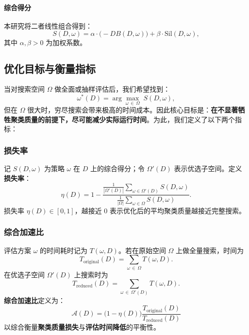 \documentclass[8pt,twocolumn]{article} %
\numberwithin{equation}{section}
\begin{document}
\paragraph{综合得分}
本研究将二者线性组合得到：
\begin{equation}\label{eq:S-score}
S(D,\omega)
= \alpha\cdot \bigl(-DB(D,\omega)\bigr)
+ \beta\cdot \mathrm{Sil}(D,\omega),
\end{equation}
其中 \(\alpha,\beta>0\) 为加权系数。

\subsection{优化目标与衡量指标}
\label{subsec:optimization-and-evaluation}

当对搜索空间 \(\Omega\) 做全面或抽样评估后，我们希望找到：
\begin{equation}\label{eq:optimal-omega}
\omega^*(D) 
= \arg\max_{\omega \,\in\, \Omega} \;S(D,\omega),
\end{equation}
但在 \(\Omega\) 很大时，穷尽搜索会带来极高的时间成本。因此核心目标是：\textbf{在不显著牺牲聚类质量的前提下，尽可能减少实际运行时间}。为此，我们定义了以下两个指标：

\subsubsection{损失率}
\label{subsubsec:loss-rate}
记 \(S(D, \omega)\) 为策略 \(\omega\) 在 \(D\) 上的综合得分；令 \(\Omega'(D)\) 表示优选子空间。定义\textbf{损失率}：
\begin{equation}\label{eq:loss-rate}
\eta(D)
= 1 - \frac{\frac{1}{|\Omega'(D)|} \sum_{\omega \in \Omega'(D)} S(D, \omega)}
{\frac{1}{|\Omega|} \sum_{\omega \in \Omega} S(D, \omega)}.
\end{equation}
损失率 \(\eta(D) \in [0,1]\)，越接近 0 表示优化后的平均聚类质量越接近完整搜索。

\subsubsection{综合加速比}
\label{subsubsec:acc-ratio}
评估方案 \(\omega\) 的时间耗时记为 \(T(\omega, D)\)。若在原始空间 \(\Omega\) 上做全量搜索，时间为
\begin{equation}\label{eq:T-original}
T_{\text{original}}(D) 
= \sum_{\omega \,\in\, \Omega} T(\omega, D).
\end{equation}
在优选子空间 \(\Omega'(D)\) 上搜索时为
\begin{equation}\label{eq:T-reduced}
T_{\text{reduced}}(D)
= \sum_{\omega \,\in\, \Omega'(D)} T(\omega, D).
\end{equation}
\textbf{综合加速比}定义为：
\begin{equation}\label{eq:comprehensive-acceleration}
\mathcal{A}(D)
= \bigl(1 - \eta(D)\bigr) \frac{T_{\text{original}}(D)}{T_{\text{reduced}}(D)}
\end{equation}
以综合衡量\textbf{聚类质量损失}与\textbf{评估时间降低}的平衡性。
\end{document}

